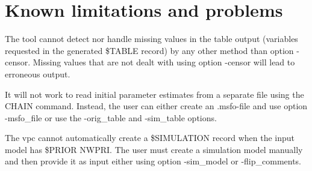 \section{Known limitations and problems}
The tool cannot detect nor handle missing values in the table output (variables requested in the generated \$TABLE record) by any other method than option -censor. Missing values that are not dealt with using option -censor will lead to erroneous output. 

It will not work to read initial parameter estimates from a separate file using the CHAIN command. Instead, the user can either create an .msfo-file and use option -msfo\_file or use the -orig\_table and -sim\_table options.

The vpc cannot automatically create a \$SIMULATION record when the input model has \$PRIOR NWPRI. The user must create a simulation model manually and then provide it as input either using option -sim\_model or -flip\_comments.




